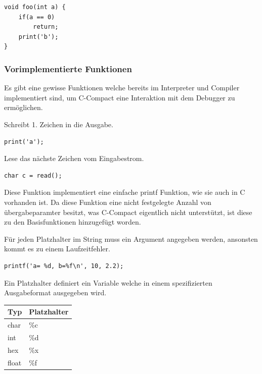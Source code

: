 \begin{lstlisting}[language=CMM]
void foo(int a) {
	if(a == 0)
		return;
	print('b');
}
\end{lstlisting}

\newpage
\subsubsection{Vorimplementierte Funktionen}

Es gibt eine gewisse Funktionen welche bereits im Interpreter und Compiler implementiert sind, um C-Compact eine Interaktion mit dem Debugger zu erm\"oglichen.


Schreibt 1. Zeichen in die Ausgabe. 

\begin{lstlisting}[language=CMM]
print('a');
\end{lstlisting}


Lese das n\"achste Zeichen vom Eingabestrom.

\begin{lstlisting}[language=CMM]
char c = read();
\end{lstlisting}


Diese Funktion implementiert eine einfache printf Funktion, wie sie auch in C vorhanden  ist. Da diese Funktion eine nicht festgelegte Anzahl von \"ubergabeparamter besitzt, was C-Compact eigentlich nicht unterst\"utzt, ist diese zu den Basisfunktionen hinzugef\"ugt worden.

F\"ur jeden Platzhalter im String muss ein Argument angegeben werden, ansonsten kommt es zu einem Laufzeitfehler.

\begin{lstlisting}[language=CMM]
printf('a= %d, b=%f\n', 10, 2.2);
\end{lstlisting}


Ein Platzhalter definiert ein Variable welche in einem spezifizierten Ausgabeformat ausgegeben wird. 

 \begin{tabular}{l | l}
  Typ & Platzhalter \\
  \hline
  char & \%c \\
  int & \%d \\
  hex & \%x \\
  float & \%f \\
 \end{tabular}

